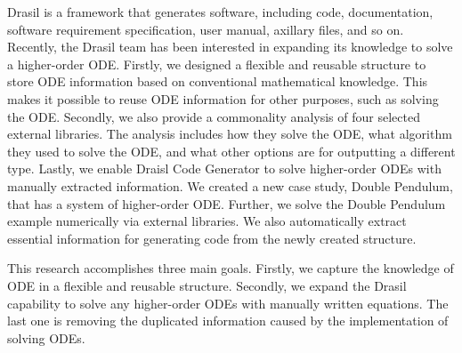Drasil is a framework that generates software, including code, documentation, software requirement specification, user manual, axillary files, and so on. Recently, the Drasil team has been interested in expanding its knowledge to solve a higher-order ODE. Firstly, we designed a flexible and reusable structure to store ODE information based on conventional mathematical knowledge. This makes it possible to reuse ODE information for other purposes, such as solving the ODE. Secondly, we also provide a commonality analysis of four selected external libraries. The analysis includes how they solve the ODE, what algorithm they used to solve the ODE, and what other options are for outputting a different type. Lastly, we enable Draisl Code Generator to solve higher-order ODEs with manually extracted information. We created a new case study, Double Pendulum, that has a system of higher-order ODE. Further, we solve the Double Pendulum example numerically via external libraries. We also automatically extract essential information for generating code from the newly created structure.

This research accomplishes three main goals. Firstly, we capture the knowledge of ODE in a flexible and reusable structure. Secondly, we expand the Drasil capability to solve any higher-order ODEs with manually written equations. The last one is removing the duplicated information caused by the implementation of solving ODEs.